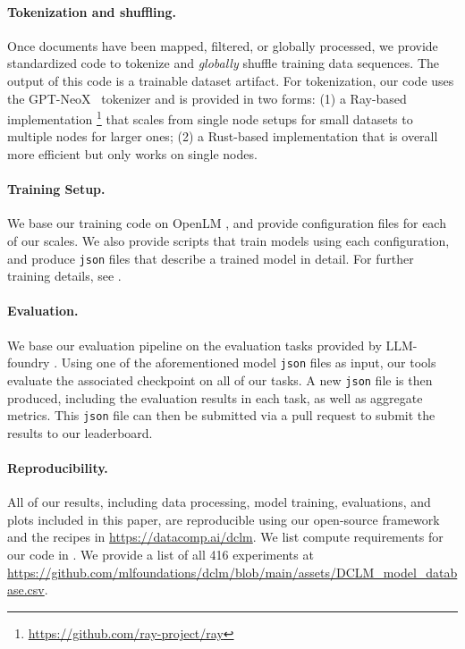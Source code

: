 \documentclass{article}
\newcommand{\numbaseline}{416}
\newcommand{\ourcode}{\url{https://datacomp.ai/dclm}\xspace}  %
\begin{document}
\paragraph{Tokenization and shuffling.}
Once documents have been mapped, filtered, or globally processed, we provide standardized code to tokenize and \textit{globally} shuffle training data sequences.
The output of this code is a trainable dataset artifact.
For tokenization, our code uses the GPT-NeoX~\citep{neox} tokenizer and is provided in two forms: (1) a Ray-based implementation \footnote{\url{https://github.com/ray-project/ray}} that scales from single node setups for small datasets to multiple nodes for larger ones; (2) a Rust-based implementation that is overall more efficient but only works on single nodes.

\paragraph{Training Setup.} We base our training code on OpenLM \citep{open_lm}, and provide configuration files for each of our scales.
We also provide scripts that train models using each configuration, and produce \texttt{json} files that describe a trained model in detail.
For further training details, see .


\paragraph{Evaluation.} We base our evaluation pipeline on the evaluation tasks provided by LLM-foundry \citep{mosailMLarithmetic}.
Using one of the aforementioned model \texttt{json} files as input, our tools evaluate the associated checkpoint on all of our tasks.
A new \texttt{json} file is then produced, including the evaluation results in each task, as well as aggregate metrics.
This \texttt{json} file can then be submitted via a pull request to submit the results to our leaderboard.


\paragraph{Reproducibility.} All of our results, including data processing, model training, evaluations, and plots included in this paper, are reproducible using our open-source framework and the recipes in \ourcode. We list compute requirements for our code in . We provide a list of all \numbaseline{} experiments at \url{https://github.com/mlfoundations/dclm/blob/main/assets/DCLM_model_database.csv}.
\end{document}
